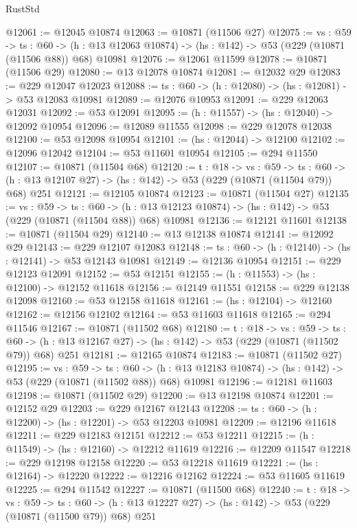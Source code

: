 \begin{lexlean}{RustStd}
\begin{coremodule}
@12061 := @12045 @10874
@12063 := @10871 (@11506 @27)
@12075 := {vs : @59} ->
  {ts : @60} ->
  (h : @13 @12063 @10874) -> (hs : @142) -> @53 (@229 (@10871 (@11506 @88)) @68) @10981
@12076 := @12061 @11599
@12078 := @10871 (@11506 @29)
@12080 := @13 @12078 @10874
@12081 := @12032 @29
@12083 := @229 @12047 @12023
@12088 := {ts : @60} -> (h : @12080) -> (hs : @12081) -> @53 @12083 @10981
@12089 := @12076 @10953
@12091 := @229 @12063 @12031
@12092 := @53 @12091
@12095 := (h : @11557) -> (hs : @12040) -> @12092 @10954
@12096 := @12089 @11555
@12098 := @229 @12078 @12038
@12100 := @53 @12098 @10954
@12101 := (hs : @12044) -> @12100
@12102 := @12096 @12042
@12104 := @53 @11601 @10954
@12105 := @294 @11550
@12107 := @10871 (@11504 @68)
@12120 := {t : @18} ->
  {vs : @59} ->
  {ts : @60} -> (h : @13 @12107 @27) -> (hs : @142) -> @53 (@229 (@10871 (@11504 @79)) @68) @251
@12121 := @12105 @10874
@12123 := @10871 (@11504 @27)
@12135 := {vs : @59} ->
  {ts : @60} ->
  (h : @13 @12123 @10874) -> (hs : @142) -> @53 (@229 (@10871 (@11504 @88)) @68) @10981
@12136 := @12121 @11601
@12138 := @10871 (@11504 @29)
@12140 := @13 @12138 @10874
@12141 := @12092 @29
@12143 := @229 @12107 @12083
@12148 := {ts : @60} -> (h : @12140) -> (hs : @12141) -> @53 @12143 @10981
@12149 := @12136 @10954
@12151 := @229 @12123 @12091
@12152 := @53 @12151
@12155 := (h : @11553) -> (hs : @12100) -> @12152 @11618
@12156 := @12149 @11551
@12158 := @229 @12138 @12098
@12160 := @53 @12158 @11618
@12161 := (hs : @12104) -> @12160
@12162 := @12156 @12102
@12164 := @53 @11603 @11618
@12165 := @294 @11546
@12167 := @10871 (@11502 @68)
@12180 := {t : @18} ->
  {vs : @59} ->
  {ts : @60} -> (h : @13 @12167 @27) -> (hs : @142) -> @53 (@229 (@10871 (@11502 @79)) @68) @251
@12181 := @12165 @10874
@12183 := @10871 (@11502 @27)
@12195 := {vs : @59} ->
  {ts : @60} ->
  (h : @13 @12183 @10874) -> (hs : @142) -> @53 (@229 (@10871 (@11502 @88)) @68) @10981
@12196 := @12181 @11603
@12198 := @10871 (@11502 @29)
@12200 := @13 @12198 @10874
@12201 := @12152 @29
@12203 := @229 @12167 @12143
@12208 := {ts : @60} -> (h : @12200) -> (hs : @12201) -> @53 @12203 @10981
@12209 := @12196 @11618
@12211 := @229 @12183 @12151
@12212 := @53 @12211
@12215 := (h : @11549) -> (hs : @12160) -> @12212 @11619
@12216 := @12209 @11547
@12218 := @229 @12198 @12158
@12220 := @53 @12218 @11619
@12221 := (hs : @12164) -> @12220
@12222 := @12216 @12162
@12224 := @53 @11605 @11619
@12225 := @294 @11542
@12227 := @10871 (@11500 @68)
@12240 := {t : @18} ->
  {vs : @59} ->
  {ts : @60} -> (h : @13 @12227 @27) -> (hs : @142) -> @53 (@229 (@10871 (@11500 @79)) @68) @251

\end{coremodule}
\end{lexlean}
